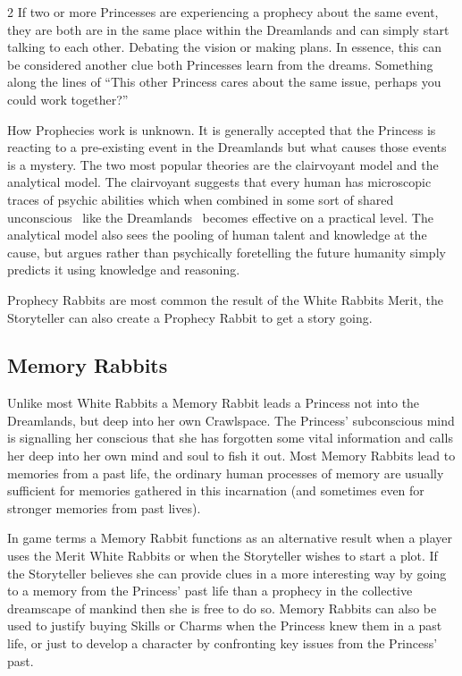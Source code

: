 \begin{multicols}{2}
If two or more Princesses are experiencing a prophecy about the same event, they are both are in the same place within the Dreamlands and can simply start talking to each other. Debating the vision or making plans. In essence, this can be considered another clue both Princesses learn from the dreams. Something along the lines of \textquotedblleft This other Princess cares about the same issue, perhaps you could work together?\textquotedblright

How Prophecies work is unknown. It is generally accepted that the Princess is reacting to a pre-existing event in the Dreamlands but what causes those events is a mystery. The two most popular theories are the clairvoyant model and the analytical model. The clairvoyant suggests that every human has microscopic traces of psychic abilities which when combined in some sort of shared unconscious \textendash\, like the Dreamlands \textendash\, becomes effective on a practical level. The analytical model also sees the pooling of human talent and knowledge at the cause, but argues rather than psychically foretelling the future humanity simply predicts it using knowledge and reasoning.

Prophecy Rabbits are most common the result of the White Rabbits Merit, the Storyteller can also create a Prophecy Rabbit to get a story going.

\subsection*{Memory Rabbits}

Unlike most White Rabbits a Memory Rabbit leads a Princess not into the Dreamlands, but deep into her own Crawlspace. The Princess' subconscious mind is signalling her conscious that she has forgotten some vital information and calls her deep into her own mind and soul to fish it out. Most Memory Rabbits lead to memories from a past life, the ordinary human processes of memory are usually sufficient for memories gathered in this incarnation (and sometimes even for stronger memories from past lives). 

In game terms a Memory Rabbit functions as an alternative result when a player uses the Merit White Rabbits or when the Storyteller wishes to start a plot. If the Storyteller believes she can provide clues in a more interesting way by going to a memory from the Princess' past life than a prophecy in the collective dreamscape of mankind then she is free to do so. Memory Rabbits can also be used to justify buying Skills or Charms when the Princess knew them in a past life, or just to develop a character by confronting key issues from the Princess' past. 


\end{multicols}
